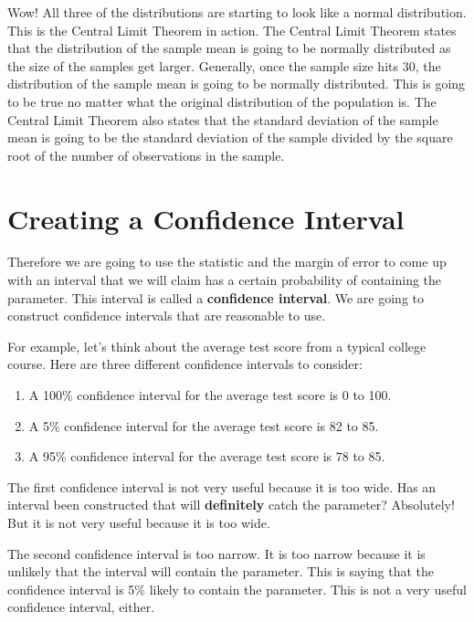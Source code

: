 \documentclass[
  letterpaper,
  DIV=11,
  numbers=noendperiod]{scrreprt}
\begin{document}
Wow! All three of the distributions are starting to look like a normal
distribution. This is the Central Limit Theorem in action. The Central
Limit Theorem states that the distribution of the sample mean is going
to be normally distributed as the size of the samples get larger.
Generally, once the sample size hits 30, the distribution of the sample
mean is going to be normally distributed. This is going to be true no
matter what the original distribution of the population is. The Central
Limit Theorem also states that the standard deviation of the sample mean
is going to be the standard deviation of the sample divided by the
square root of the number of observations in the sample.

\section*{Creating a Confidence
Interval}\label{creating-a-confidence-interval}


Therefore we are going to use the statistic and the margin of error to
come up with an interval that we will claim has a certain probability of
containing the parameter. This interval is called a \textbf{confidence
interval}. We are going to construct confidence intervals that are
reasonable to use.

For example, let's think about the average test score from a typical
college course. Here are three different confidence intervals to
consider:

\begin{enumerate}
\def\labelenumi{\arabic{enumi}.}
\item
  A 100\% confidence interval for the average test score is 0 to 100.
\item
  A 5\% confidence interval for the average test score is 82 to 85.
\item
  A 95\% confidence interval for the average test score is 78 to 85.
\end{enumerate}

The first confidence interval is not very useful because it is too wide.
Has an interval been constructed that will \textbf{definitely} catch the
parameter? Absolutely! But it is not very useful because it is too wide.

The second confidence interval is too narrow. It is too narrow because
it is unlikely that the interval will contain the parameter. This is
saying that the confidence interval is 5\% likely to contain the
parameter. This is not a very useful confidence interval, either.
\end{document}
